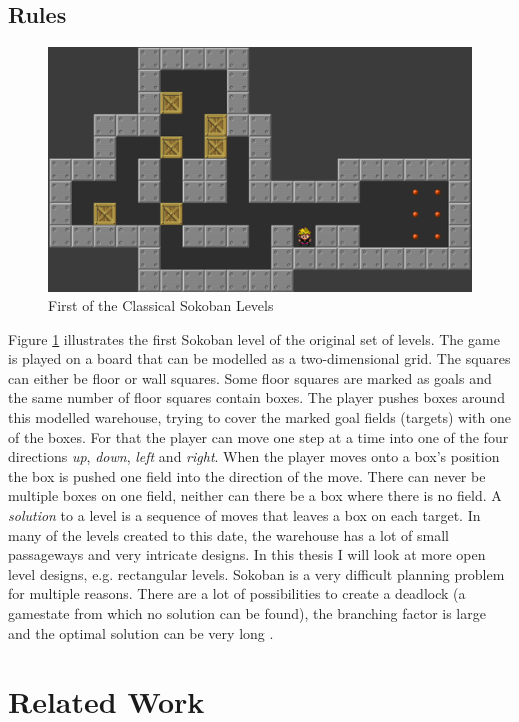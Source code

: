 \documentclass{report}
\begin{document}
\section{Rules} \label{IntroStr}
\begin{figure}[ht]
\centering
\includegraphics[scale=0.2]{SokobanLevel1}
\caption{First of the Classical Sokoban Levels}
\label{fig:1}
\end{figure}
Figure \ref{fig:1} illustrates the first Sokoban level of the original set of levels. The game is played on a board that can be modelled as a two-dimensional grid. The squares can either be floor or wall squares. Some floor squares are marked as goals and the same number of floor squares contain boxes. The player pushes boxes around this modelled warehouse, trying to cover the marked goal fields (targets) with one of the boxes. For that the player can move one step at a time into one of the four directions \textit{up}, \textit{down}, \textit{left} and \textit{right}. When the player moves onto a box's position the box is pushed one field into the direction of the move. There can never be multiple boxes on one field, neither can there be a box where there is no field. A \textit{solution} to a level is a sequence of moves that leaves a box on each target.
In many of the levels created to this date, the warehouse has a lot of small passageways and very intricate designs. In this thesis I will look at more open level designs, e.g. rectangular levels.
Sokoban is a very difficult planning problem for multiple reasons. There are a lot of possibilities to create a deadlock (a gamestate from which no solution can be found), the branching factor is large and the optimal solution can be very long \cite{BoteaHeuristicsVsPlanning}.
\chapter{Related Work}
\end{document}
